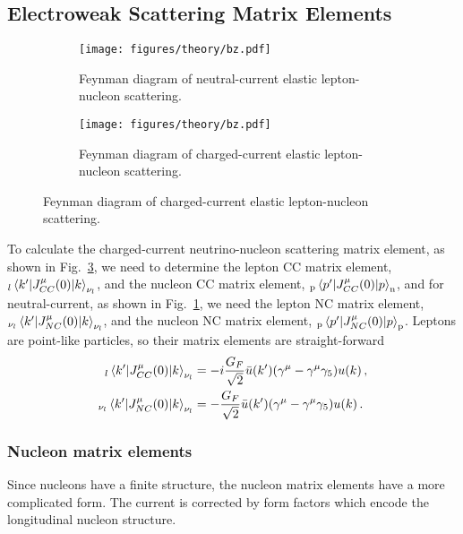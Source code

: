 \subsection{Electroweak Scattering Matrix Elements}

  \begin{figure}[h]
    \centering
    \begin{subfigure}{2.5in}
      \texttt{[image: figures/theory/bz.pdf]}
      \caption{Feynman diagram of neutral-current elastic lepton-nucleon
      scattering.}
      \label{fig:ncefeynman}
    \end{subfigure}
    \hspace{2pt}
    \begin{subfigure}{2.5in}
      \texttt{[image: figures/theory/bz.pdf]}
      \caption{Feynman diagram of charged-current elastic lepton-nucleon
      scattering.}
      \label{fig:ccqefeynman}
    \end{subfigure}
  \end{figure}

  To calculate the charged-current neutrino-nucleon scattering matrix element,
  as shown in Fig.~\ref{fig:ccqefeynman}, we need to determine the lepton CC
  matrix element, $_{l}\mel{k'}{J^{\mu}_{CC}(0)}{k}_{\nu_l}$, and the nucleon
  CC matrix element, $_{\textrm{p}}\mel{p'}{J^{\mu}_{CC}(0)}{p}_{\textrm{n}}$,
  and for neutral-current, as shown in Fig.~\ref{fig:ncefeynman}, we need the
  lepton NC matrix element, $_{\nu_l}\mel{k'}{J^{\mu}_{NC}(0)}{k}_{\nu_l}$, and
  the nucleon NC matrix element,
  $_{\textrm{p}}\mel{p'}{J^{\mu}_{NC}(0)}{p}_{\textrm{p}}$. Leptons are
  point-like particles, so their matrix elements are straight-forward
  \begin{equation}\label{eq:leptonmatel}
    \begin{aligned}
      _l\mel{k'}{J^{\mu}_{CC}(0)}{k}_{\nu_l}
        &= -i\frac{G_F}{\sqrt{2}}\bar{u}(k')(\gamma^{\mu} - \gamma^{\mu}\gamma_5)u(k) \,, \\
        _{\nu_l}\mel{k'}{J^{\mu}_{NC}(0)}{k}_{\nu_l}
        &= -\frac{G_F}{\sqrt{2}}\bar{u}(k')(\gamma^{\mu} - \gamma^{\mu}\gamma_5)u(k) \,.
    \end{aligned}
  \end{equation}

  \subsubsection{Nucleon matrix elements}
  Since nucleons have a finite structure, the nucleon matrix elements have a
  more complicated form. The current is corrected by form factors which encode
  the longitudinal nucleon structure.

